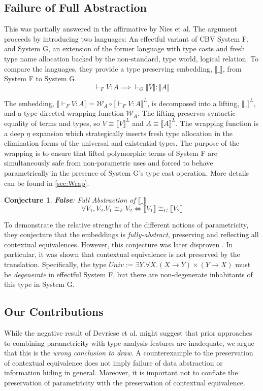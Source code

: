 \documentclass[acmsmall]{acmart}
\newcommand{\den}[1]{\llbracket #1\rrbracket}
\newtheorem*{conjecture*}{Conjecture}
\begin{document}
\subsection{Failure of Full Abstraction}
This was partially answered in the affirmative by Nies et al\cite{NonParam}. The argument proceeds by introducing two languages: An effectful variant of CBV System F, and System G, an extension of the former language with type casts and fresh type name allocation backed by the non-standard, type world, logical relation.
To compare the languages, they provide a type preserving embedding, $\den{\_}$, from System F to System G. 
  $$\vdash_F V : A \implies \vdash_G \den{V} : \den{A}$$

The embedding, $\den{\vdash_F V:A} = \mathcal{W}_{A} \circ \den{\vdash_F V:A}^L$, is decomposed into a lifting, $\den{\_}^L$, and a type directed wrapping function $\mathcal{W}_A$. The lifting preserves syntactic equality of terms and types, so $V \equiv \den{V}^L$ and $A \equiv \den{A}^L$. The wrapping function is a deep $\eta$ expansion which strategically inserts fresh type allocation in the elimination forms of the universal and existential types. The purpose of the wrapping is to ensure that lifted polymorphic terms of System F are simultaneously safe from non-parametric uses and forced to behave parametrically in the presence of System G's type cast operation. More details can be found in \cref{sec:Wrap}. 

\begin{conjecture*}
  \textbf{False}: Full Abstraction of $\den{\_}$
  $$\forall V_1,V_2. V_1\cong_F V_2 \iff \den{V_1} \cong_G \den{V_2}$$
\end{conjecture*}

To demonstrate the relative strengths of the different notions of parametricity, they conjecture that the embeddings is \emph{fully-abstract}, preserving and reflecting all contextual equivalences. However, this conjecture was later disproven\cite{ParamVSUniv} \cite{TwoParamVSThreeUniv}. In particular, it was shown that contextual equivalence is not preserved by the translation. Specifically, the type $Univ := \exists Y.\forall X. (X\rightarrow Y)\times (Y \rightarrow X)$ must be \emph{degenerate} in effectful System F, but there are non-degenerate inhabitants of this type in System G.

\subsection{Our Contributions}
While the negative result of Devriese et al. \cite{TwoParamVSThreeUniv} might suggest that prior approaches to combining parametricity with type-analysis features are inadequate, we argue that this is the \emph{wrong conclusion to draw}. A counterexample to the preservation of contextual equivalence does not imply failure of data abstraction or information hiding in general. Moreover, it is important not to conflate the preservation of parametricity with the preservation of contextual equivalence.
\end{document}
